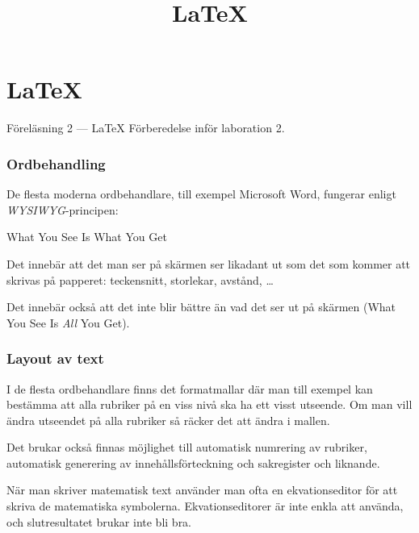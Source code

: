 
\title{\LaTeX}
\section{\LaTeX}

\begin{frame}[fragile=singleslide]
  \label{latex}
  \begin{block}{\centering\Large Föreläsning 2 --- \LaTeX}
    Förberedelse inför laboration 2.

    \begin{itemize}
      \ii{\LaTeX}
  \end{itemize}
  \end{block}
\end{frame} 

\begin{frame}[fragile=singleslide]
\frametitle{Ordbehandling}
De flesta moderna ordbehandlare, till exempel Microsoft Word,  fungerar 
enligt \emph{WYSIWYG}-principen:

\blankline
\begin{center}
What You See Is What You Get
\end{center}

\blankline
Det innebär att det man ser på skärmen ser likadant ut som det som kommer
att skrivas på papperet: teckensnitt, storlekar, avstånd, \ldots

Det innebär också att det inte blir bättre än vad det ser ut
på skärmen (What You See Is \emph{All} You Get).
\end{frame} 

\begin{frame}[fragile=singleslide]
\frametitle{Layout av text}
I de flesta ordbehandlare finns det
formatmallar där man till exempel kan bestämma att alla rubriker på
en viss nivå ska ha ett visst utseende. Om man vill ändra
utseendet på alla rubriker så räcker det att ändra i mallen.

\blankline
Det brukar också finnas möjlighet till automatisk numrering av 
rubriker, automatisk generering av innehållsförteckning och 
sakregister och liknande. 

\blankline
När man skriver matematisk text använder man ofta en ekvationseditor
för att skriva de matematiska symbolerna. Ekvationseditorer är inte
enkla att använda, och slutresultatet brukar inte bli bra.
\end{frame} 

